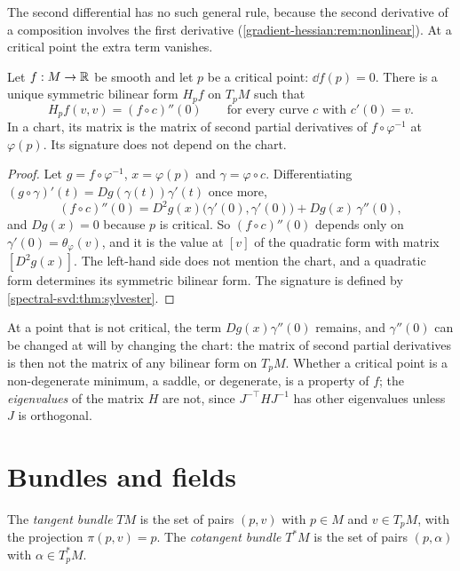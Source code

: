 \begin{notechapter}
The second differential has no such general rule, because the second
derivative of a composition involves the first derivative
(\cref{gradient-hessian:rem:nonlinear}). At a critical point the extra
term vanishes.

\begin{proposition}
\label{tangent-bundles:prop:hessian}
Let $f:M\to\mathbb{R}$ be smooth and let $p$ be a critical point:
$\dd f(p) = 0$. There is a unique symmetric bilinear form $H_pf$ on
$T_pM$ such that
\[
  H_pf(v, v) = (f\circ c)''(0)
  \qquad\text{for every curve $c$ with $c'(0) = v$.}
\]
In a chart, its matrix is the matrix of second partial derivatives of
$f\circ\varphi^{-1}$ at $\varphi(p)$. Its signature does not depend on
the chart.
\end{proposition}

\begin{proof}
Let $g = f\circ\varphi^{-1}$, $x = \varphi(p)$ and
$\gamma = \varphi\circ c$. Differentiating
$(g\circ\gamma)'(t) = Dg(\gamma(t))\gamma'(t)$ once more,
\[
  (f\circ c)''(0) = D^2g(x)\bigl(\gamma'(0), \gamma'(0)\bigr)
  + Dg(x)\,\gamma''(0) ,
\]
and $Dg(x) = 0$ because $p$ is critical. So $(f\circ c)''(0)$ depends
only on $\gamma'(0) = \theta_\varphi(v)$, and it is the value at $[v]$ of
the quadratic form with matrix $[D^2g(x)]$. The left-hand side does not
mention the chart, and a quadratic form determines its symmetric bilinear
form. The signature is defined by \cref{spectral-svd:thm:sylvester}.
\end{proof}

At a point that is not critical, the term $Dg(x)\gamma''(0)$ remains, and
$\gamma''(0)$ can be changed at will by changing the chart: the matrix of
second partial derivatives is then not the matrix of any bilinear form on
$T_pM$. Whether a critical point is a non-degenerate minimum, a saddle,
or degenerate, is a property of $f$; the \emph{eigenvalues} of the matrix
$H$ are not, since $J^{-\top}HJ^{-1}$ has other eigenvalues unless $J$
is orthogonal.

\section{Bundles and fields}\label{tangent-bundles:sec:bundles}

\begin{definition}
\label{tangent-bundles:def:bundle}
The \emph{tangent bundle} $TM$ is the set of pairs $(p, v)$ with
$p\in M$ and $v\in T_pM$, with the projection $\pi(p, v) = p$. The
\emph{cotangent bundle} $T^*M$ is the set of pairs $(p, \alpha)$ with
$\alpha\in T_p^*M$.
\end{definition}


\end{notechapter}

